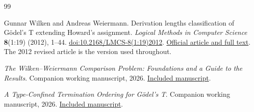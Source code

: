 \begin{thebibliography}{99}

Gunnar Wilken and Andreas Weiermann.
Derivation lengths classification of G\"odel's T extending Howard's assignment.
\emph{Logical Methods in Computer Science} \textbf{8}(1:19) (2012), 1--44.
\href{https://doi.org/10.2168/LMCS-8(1:19)2012}
{doi:10.2168/LMCS-8(1:19)2012}.
\href{https://lmcs.episciences.org/1073}{Official article and full text}.
The 2012 revised article is the version used throughout.

\emph{The Wilken--Weiermann Comparison Problem: Foundations and a Guide to the Results}. Companion working manuscript, 2026.
\href{../05-wilken-weiermann-foundations/paper.pdf}{Included manuscript}.

\emph{A Type-Confined Termination Ordering for G\"odel's T}. Companion working manuscript, 2026.
\href{../06-godel-t-termination-ordering/paper.pdf}{Included manuscript}.
\end{thebibliography}
